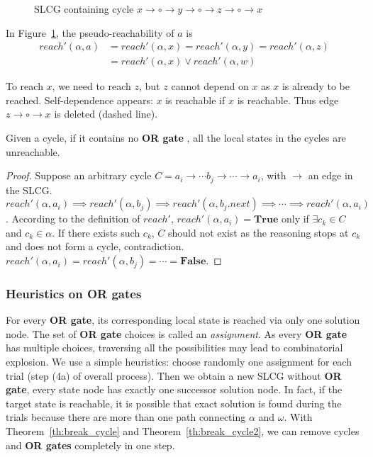 \documentclass[runningheads]{llncs}
\begin{document}
\begin{example}
    \begin{figure}[H]
        \centering
        
        \caption{SLCG containing cycle $x\to \circ \to y \to \circ \to z\to \circ \to x$}
        \label{cycle1}
    \end{figure}
    
    In Figure~\ref{cycle1}, the pseudo-reachability of $a$ is 
    \begin{align*}
        reach'(\alpha,a)&=reach'(\alpha,x)=reach'(\alpha,y)=reach'(\alpha,z)\\
        &=reach'(\alpha,x)\lor reach'(\alpha,w)
    \end{align*}
    
    To reach $x$, we need to reach $z$, but $z$ cannot depend on $x$ as $x$ is already to be reached. 
    Self-dependence appears: $x$ is reachable if $x$ is reachable.
    Thus edge $z\to \circ \to x$ is deleted (dashed line).
\end{example}

\begin{theorem}\label{th:break_cycle2}
Given a cycle, if it contains no \textbf{OR gate}%
, all the local states in the cycles are unreachable.
\end{theorem}

\begin{proof}
Suppose an arbitrary cycle $C=a_i\to \cdots b_j\to\cdots \to a_i$, with $\to$ an edge in the SLCG.
$reach'(\alpha,a_i)\implies reach'(\alpha,b_j)\implies reach'(\alpha,b_j.next)\implies \cdots\implies reach'(\alpha,a_i)$.
According to the definition of $reach'$, $reach'(\alpha,a_i)=\mathbf{True}$ only if $\exists c_k\in C$ and $c_k\in \alpha$.
If there exists such $c_k$, $C$ should not exist as the reasoning stops at $c_k$ and does not form a cycle, contradiction.
$reach'(\alpha,a_i)=reach'(\alpha,b_j)=\cdots =\mathbf{False}$.
\end{proof}

\subsubsection{Heuristics on OR gates}\label{sec:OR}
For every \textbf{OR gate}, its corresponding local state is reached via only one solution node.
The set of \textbf{OR gate} choices is called an \textit{assignment}.
As every \textbf{OR gate} has multiple choices, traversing all the possibilities may lead to combinatorial explosion.
We use a simple heuristics: 
choose randomly one assignment for each trial (step (4a) of overall process).
Then we obtain a new SLCG without \textbf{OR gate}, every state node has exactly one successor solution node.
In fact, if the target state is reachable, it is possible that exact solution is found during the trials because there are more than one path connecting $\alpha$ and $\omega$.
With Theorem~\ref{th:break_cycle} and Theorem~\ref{th:break_cycle2}, we can remove cycles and \textbf{OR gates} completely in one step.
\end{document}

